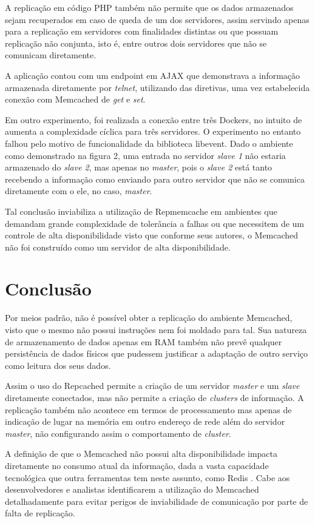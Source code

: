 \documentclass[conference]{IEEEtran}
\begin{document}
A replicação em código PHP também não permite que os dados armazenados sejam recuperados em caso de queda de um dos servidores, assim servindo apenas para a replicação em servidores com finalidades distintas ou que possuam replicação não conjunta, isto é, entre outros dois servidores que não se comunicam diretamente.

A aplicação contou com um endpoint em AJAX que demonstrava a informação armazenada diretamente por \textit{telnet}, utilizando das diretivas, uma vez estabelecida conexão com Memcached de \textit{get} e \textit{set}.

Em outro experimento, foi realizada a conexão entre três Dockers, no intuito de aumenta a complexidade cíclica para três servidores. O experimento no entanto falhou pelo motivo de funcionalidade da biblioteca libevent. Dado o ambiente como demonstrado na figura 2, uma entrada no servidor \textit{slave 1} não estaria armazenado do \textit{slave 2}, mas apenas no \textit{master}, pois o \textit{slave 2} está tanto recebendo a informação como enviando para outro servidor que não se comunica diretamente com o ele, no caso, \textit{master}. 

Tal conclusão inviabiliza a utilização de Repmemcache em ambientes que demandam grande complexidade de tolerância a falhas ou que necessitem de um controle de alta disponibilidade visto que conforme seus autores, o Memcached não foi construído como um servidor de alta disponibilidade.


\section{Conclusão}

Por meios padrão, não é possível obter a replicação do ambiente Memcached, visto que o mesmo não possui instruções nem foi moldado para tal. Sua natureza de armazenamento de dados apenas em RAM também não prevê qualquer persistência de dados físicos que pudessem justificar a adaptação de outro serviço como leitura dos seus dados.

Assim o uso do Repcached permite a criação de um servidor \textit{master} e um \textit{slave} diretamente conectados, mas não permite a criação de \textit{clusters} de informação. A replicação também não acontece em termos de processamento mas apenas de indicação de lugar na memória em outro endereço de rede além do servidor \textit{master}, não configurando assim o comportamento de \textit{cluster}.

A definição de que o Memcached não possui alta disponibilidade impacta diretamente no consumo atual da informação, dada a vasta capacidade tecnológica que outra ferramentas tem neste assunto, como Redis \cite{Redis}. Cabe aos desenvolvedores e analistas identificarem a utilização do Memcached detalhadamente para evitar perigos de inviabilidade de comunicação por parte de falta de replicação.


\renewcommand{\refname}{Referências}

\end{document}
